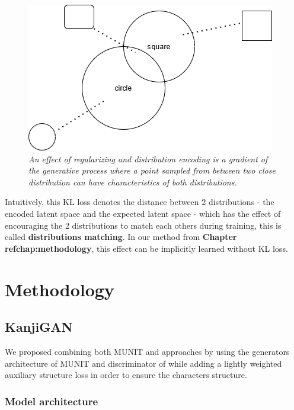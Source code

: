 \documentclass[12pt]{report}
\begin{document}
\begin{figure}[h]
	\centering
	\includegraphics[scale=0.9]{distribution-space}
	\caption{\textit{An effect of regularizing and distribution encoding is a gradient of the generative process where a point sampled from between two close distribution can have characteristics of both distributions.}}
	\label{fig:distribution-space}
\end{figure}

Intuitively, this KL loss denotes the distance between 2 distributions - the encoded latent space and the expected latent space - which has the effect of encouraging the 2 distributions to match each others during training, this is called \textbf{distributions matching}. In our method from \textbf{Chapter ref{chap:methodology}}, this effect can be implicitly learned without KL loss.

\chapter{Methodology}
\label{chap:methodology}

\section{KanjiGAN}

We proposed combining both MUNIT and \cite{ganimorph} approaches by using the generators architecture of MUNIT and discriminator of \cite{ganimorph} while adding a lightly weighted auxiliary structure loss in order to ensure the characters structure.

\subsection{Model architecture}
\end{document}
